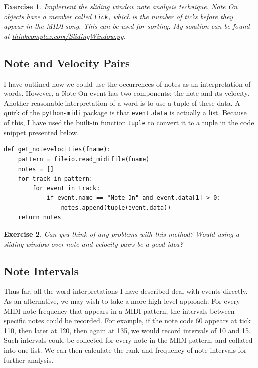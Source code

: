 \documentclass[10pt]{book}
\newtheorem{exercise}{Exercise}[chapter]
\begin{document}
\begin{exercise}
Implement the sliding window note analysis technique. Note On objects have a member called \texttt{tick}, which is the number of ticks before they appear in the MIDI song. This can be used for sorting. My solution can be found at \url{thinkcomplex.com/SlidingWindow.py}.
\end{exercise}


\subsection{Note and Velocity Pairs}
I have outlined how we could use the occurrences of notes as an interpretation of words. However, a Note On event has two components; the note and its velocity. Another reasonable interpretation of a word is to use a tuple of these data. A quirk of the \texttt{python-midi} package is that \texttt{event.data} is actually a list. Because of this, I have used the built-in function \texttt{tuple} to convert it to a tuple in the code snippet presented below.

\begin{verbatim}
def get_notevelocities(fname):
    pattern = fileio.read_midifile(fname)
    notes = []
    for track in pattern:
        for event in track:
            if event.name == "Note On" and event.data[1] > 0:
                notes.append(tuple(event.data))
    return notes
\end{verbatim}


\begin{exercise}
Can you think of any problems with this method? Would using a sliding window over note and velocity pairs be a good idea?
\end{exercise}



\subsection{Note Intervals}
Thus far, all the word interpretations I have described deal with events directly. As an alternative, we may wish to take a more high level approach. For every MIDI note frequency that appears in a MIDI pattern, the intervals between specific notes could be recorded. For example, if the note code 60 appears at tick 110, then later at 120, then again at 135, we would record intervals of 10 and 15. Such intervals could be collected for every note in the MIDI pattern, and collated into one list. We can then calculate the rank and frequency of note intervals for further analysis.
\end{document}
